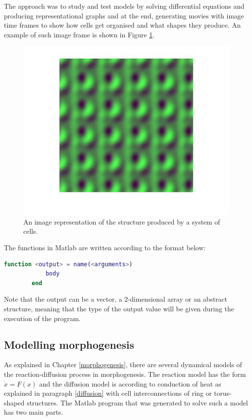 The approach was to study and test models by solving differential equations and producing representational graphs and at the end, generating movies with image time frames to show how cells get organised and what shapes they produce. An example of such image frame is shown in Figure \ref{pattern}.
\begin{figure}[h!]
    \includegraphics[scale=0.5]{pattern.png}
    \centering
    \caption{An image representation of the structure produced by a system of cells.} 
    \label{pattern}
\end{figure}   
    
The functions in Matlab are written according to the format below:
    \begin{lstlisting}[language=matlab]
        function <output> = name(<arguments>)
            body
        end
    \end{lstlisting}
    
    Note that the output can be a vector, a 2-dimensional array or an abstract structure, meaning that the type of the output value will be given during the execution of the program.  
	\subsection{Modelling morphogenesis}	
    
As explained in Chapter \ref{morphogenesis}, there are several dynamical models of the reaction-diffusion process in morphogenesis. The reaction model has the form $ \dot{x}=F(x) $ and the diffusion model is according to conduction of heat as explained in paragraph \ref{diffusion} with cell interconnections of ring or torus-shaped structures. The Matlab program that was generated to solve such a model has two main parts.
    

